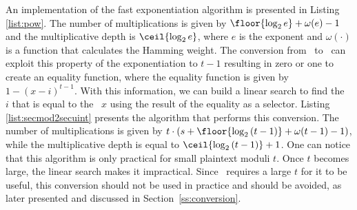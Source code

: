 An implementation of the fast exponentiation algorithm is presented in Listing \ref{list:pow}. The number of multiplications is given by $\floor{\log_2{e}} + \omega(e) - 1$ and the multiplicative depth is $\ceil{\log_2{e}}$, where $e$ is the exponent and $\omega(\cdot)$ is a function that calculates the Hamming weight. The conversion from \secmod\ to \secuint\ can exploit this property of the exponentiation to $t-1$ resulting in zero or one to create an equality function, where the equality function is given by $1 - (x-i)^{t-1}$. With this information, we can build a linear search to find the \secuint\ $i$ that is equal to the \secmod\ $x$ using the result of the equality as a selector. Listing \ref{list:secmod2secuint} presents the algorithm that performs this conversion.
The number of multiplications is given by $t \cdot (s + \floor{\log_2{(t-1)}} + \omega(t-1) - 1)$, while the multiplicative depth is equal to $\ceil{\log_2{(t-1)}} + 1$.
One can notice that this algorithm is only practical for small plaintext moduli $t$. Once $t$ becomes large, the linear search makes it impractical. Since \secmod\ requires a large $t$ for it to be useful, this conversion should not be used in practice and should be avoided, as later presented and discussed in Section~\ref{ss:conversion}.


